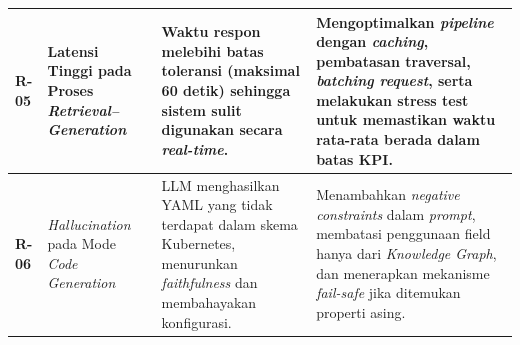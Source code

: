 \begin{longtable}{|p{1.2cm}|p{3cm}|p{3.8cm}|p{3.8cm}|}
\textbf{R-05} &
Latensi Tinggi pada Proses \textit{Retrieval--Generation} &
Waktu respon melebihi batas toleransi (maksimal 60 detik) sehingga sistem sulit digunakan secara \textit{real-time}. &
Mengoptimalkan \textit{pipeline} dengan \textit{caching}, pembatasan traversal, \textit{batching request}, serta melakukan stress test untuk memastikan waktu rata-rata berada dalam batas KPI. \\ \hline

\textbf{R-06} &
\textit{Hallucination} pada Mode \textit{Code Generation} &
LLM menghasilkan YAML yang tidak terdapat dalam skema Kubernetes, menurunkan \textit{faithfulness} dan membahayakan konfigurasi. &
Menambahkan \textit{negative constraints} dalam \textit{prompt}, membatasi penggunaan field hanya dari \textit{Knowledge Graph}, dan menerapkan mekanisme \textit{fail-safe} jika ditemukan properti asing. \\ \hline

\end{longtable}